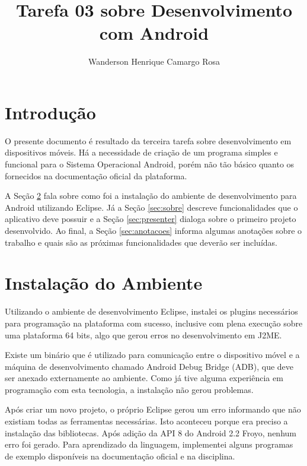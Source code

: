 \documentclass{article}
\title{Tarefa 03 sobre Desenvolvimento com Android}
\author{Wanderson Henrique Camargo Rosa\inst{1}}
\begin{document}
\maketitle{}

\section{Introdução}
\label{sec:introducao}

O presente documento é resultado da terceira tarefa sobre desenvolvimento em
dispositivos móveis. Há a necessidade de criação de um programa simples e
funcional para o Sistema Operacional Android, porém não tão básico quanto os
fornecidos na documentação oficial da plataforma.

A Seção \ref{sec:ambiente} fala sobre como foi a instalação do ambiente de
desenvolvimento para Android utilizando Eclipse. Já a Seção \ref{sec:sobre}
descreve funcionalidades que o aplicativo deve possuir e a Seção
\ref{sec:presenter} dialoga sobre o primeiro projeto desenvolvido. Ao final, a
Seção \ref{sec:anotacoes} informa algumas anotações sobre o trabalho e quais são
as próximas funcionalidades que deverão ser incluídas.

\section{Instalação do Ambiente}
\label{sec:ambiente}

Utilizando o ambiente de desenvolvimento Eclipse, instalei os plugins
necessários para programação na plataforma com sucesso, inclusive com plena
execução sobre uma plataforma 64 bits, algo que gerou erros no desenvolvimento
em J2ME.

Existe um binário que é utilizado para comunicação entre o dispositivo móvel e a
máquina de desenvolvimento chamado Android Debug Bridge (ADB), que deve ser
anexado externamente ao ambiente. Como já tive alguma experiência em programação
com esta tecnologia, a instalação não gerou problemas.

Após criar um novo projeto, o próprio Eclipse gerou um erro informando que não
existiam todas as ferramentas necessárias. Isto aconteceu porque era preciso a
instalação das bibliotecas. Após adição da API 8 do Android 2.2 Froyo, nenhum
erro foi gerado. Para aprendizado da linguagem, implementei alguns programas de
exemplo disponíveis na documentação oficial e na disciplina.
\end{document}
